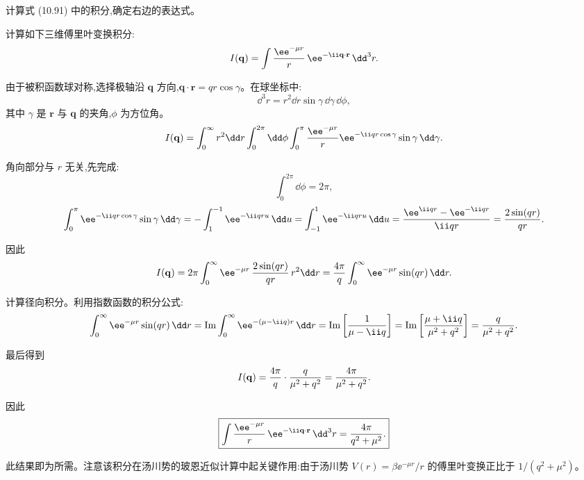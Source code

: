 \begin{question}
计算式 (10.91) 中的积分,确定右边的表达式。

\par\smallskip
{}

\begin{solution}
计算如下三维傅里叶变换积分:
\[
I(\mathbf q)=\int {\ee^{-\mu r}\over r}\,\ee^{-\ii\mathbf q\cdot\mathbf r}\,\dd^3r.
\]

由于被积函数球对称,选择极轴沿 $\mathbf q$ 方向,$\mathbf q\cdot\mathbf r=qr\cos\gamma$。在球坐标中:
\[
\dd^3r=r^2\dd r\sin\gamma\,\dd\gamma\,\dd\phi,
\]
其中 $\gamma$ 是 $\mathbf r$ 与 $\mathbf q$ 的夹角,$\phi$ 为方位角。
\[
I(\mathbf q)=\int_0^\infty r^2\dd r\int_0^{2\pi}\dd\phi\int_0^\pi {\ee^{-\mu r}\over r}\ee^{-\ii qr\cos\gamma}\sin\gamma\,\dd\gamma.
\]

角向部分与 $r$ 无关,先完成:
\[
\int_0^{2\pi}\dd\phi=2\pi,
\]
\[
\int_0^\pi \ee^{-\ii qr\cos\gamma}\sin\gamma\,\dd\gamma
=-\int_1^{-1}\ee^{-\ii qr u}\,\dd u
=\int_{-1}^{1}\ee^{-\ii qr u}\,\dd u
={\ee^{\ii qr}-\ee^{-\ii qr}\over\ii qr}={2\sin(qr)\over qr}.
\]

因此
\[
I(\mathbf q)=2\pi\int_0^\infty \ee^{-\mu r}\,{2\sin(qr)\over qr}\,r^2\dd r
={4\pi\over q}\int_0^\infty \ee^{-\mu r}\sin(qr)\,\dd r.
\]

计算径向积分。利用指数函数的积分公式:
\[
\int_0^\infty \ee^{-\mu r}\sin(qr)\,\dd r
=\operatorname{Im}\int_0^\infty \ee^{-(\mu-\ii q)r}\,\dd r
=\operatorname{Im}\left[{1\over\mu-\ii q}\right]
=\operatorname{Im}\left[{\mu+\ii q\over\mu^2+q^2}\right]
={q\over\mu^2+q^2}.
\]

最后得到
\[
I(\mathbf q)={4\pi\over q}\cdot{q\over\mu^2+q^2}
={4\pi\over\mu^2+q^2}.
\]

因此
\[
\boxed{\int {\ee^{-\mu r}\over r}\,\ee^{-\ii\mathbf q\cdot\mathbf r}\,\dd^3r={4\pi\over q^2+\mu^2}.}
\]

此结果即为所需。注意该积分在汤川势的玻恩近似计算中起关键作用:由于汤川势 $V(r)=\beta \ee^{-\mu r}/r$ 的傅里叶变换正比于 $1/(q^2+\mu^2)$。
\end{solution}
\end{question}

